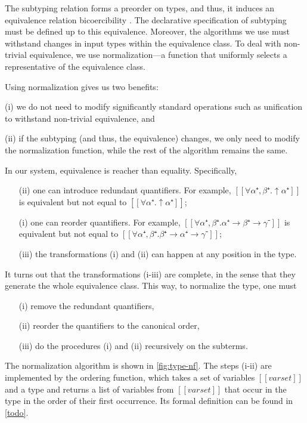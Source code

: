 The subtyping relation forms a preorder on types,
and thus, it induces an equivalence relation \aka bicoercibility 
\cite{tiuryn1995:bicoercibility}.
The declarative specification of subtyping must be defined up to this equivalence.
Moreover, the algorithms we use must withstand changes in input types within the equivalence class.
To deal with non-trivial equivalence, 
we use normalization---a function that uniformly selects a representative of the equivalence class.

Using normalization gives us two benefits:
\begin{enumerate*}
  \item [(i)] we do not need to modify significantly standard operations such as unification to withstand non-trivial equivalence, and
  \item [(ii)] if the subtyping (and thus, the equivalence) changes, we only need to modify the normalization function, 
    while the rest of the algorithm remains the same.
\end{enumerate*}

In our system, equivalence is reacher than equality. Specifically,
\begin{enumerate}
  \item[(ii)] one can introduce redundant quantifiers. For example, $[[∀α⁺,β⁺.↑α⁺]]$ is equivalent
  but not equal to $[[∀α⁺.↑α⁺]]$;
  \item[(i)] one can reorder quantifiers. For example, $[[∀α⁺,β⁺.α⁺ → β⁺ → γ⁻]]$ is equivalent but not equal to
  $[[∀α⁺,β⁺.β⁺ → α⁺ → γ⁻]]$; 
  \item[(iii)] the transformations (i) and (ii) can happen at any
    position in the type.
\end{enumerate}

It turns out that the transformations (i-iii) are complete, 
in the sense that they generate the whole equivalence class.
This way, to normalize the type, one must
\begin{enumerate}
  \item [(i)] remove the redundant quantifiers,
  \item [(ii)] reorder the quantifiers to the canonical order,
  \item [(iii)] do the procedures (i) and (ii) recursively on the subterms.
\end{enumerate}

The normalization algorithm is shown in \cref{fig:type-nf}.
The steps (i-ii) are implemented by the ordering function, which takes a set of variables $[[varset]]$
and a type and returns a list of variables from $[[varset]]$ that occur in the type in the order of their
first occurrence. Its formal definition can be found in \cref{todo}.

